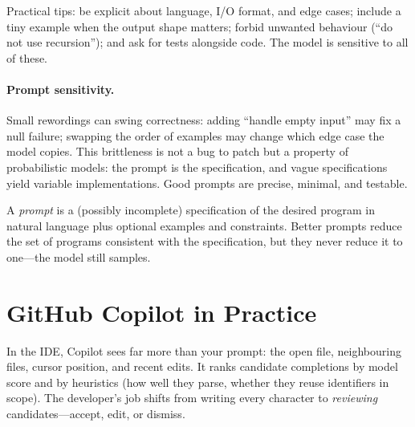 Practical tips: be explicit about language, I/O format, and edge cases; include a tiny example when the output shape matters; forbid unwanted behaviour (``do not use recursion''); and ask for tests alongside code. The model is sensitive to all of these.

\paragraph{Prompt sensitivity.} Small rewordings can swing correctness: adding ``handle empty input'' may fix a null failure; swapping the order of examples may change which edge case the model copies. This brittleness is not a bug to patch but a property of probabilistic models: the prompt is the specification, and vague specifications yield variable implementations. Good prompts are precise, minimal, and testable.

\begin{definition}
A \emph{prompt} is a (possibly incomplete) specification of the desired program in natural language plus optional examples and constraints. Better prompts reduce the set of programs consistent with the specification, but they never reduce it to one---the model still samples.
\end{definition}

\section{GitHub Copilot in Practice}
\label{sec:copilot}
In the IDE, Copilot sees far more than your prompt: the open file, neighbouring files, cursor position, and recent edits. It ranks candidate completions by model score and by heuristics (how well they parse, whether they reuse identifiers in scope). The developer's job shifts from writing every character to \emph{reviewing} candidates---accept, edit, or dismiss.

